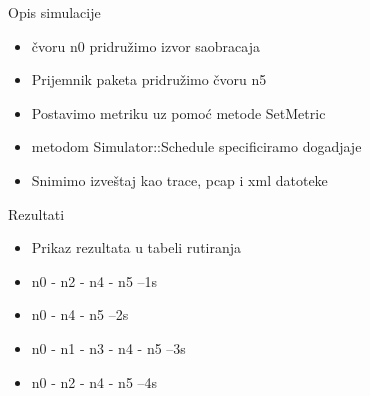 \documentclass{beamer}
\begin{document}
\begin{frame}

\begin{block}{Opis simulacije} 

\begin{itemize}

	\item	\v cvoru n0 pridru\v zimo izvor saobracaja
	\item	Prijemnik paketa pridru\v zimo \v cvoru n5
	\item	Postavimo metriku uz pomo\' c metode SetMetric
	\item	metodom Simulator::Schedule specificiramo dogadjaje
	\item	Snimimo izve\v staj kao trace, pcap i xml datoteke
  \end{itemize}
  \end{block}
\end{frame}

\begin{frame}
\begin{block}{Rezultati} 

\begin{itemize}

	\item	Prikaz rezultata u tabeli rutiranja
	\item	n0 - n2 - n4 - n5   --1s
	\item	n0 - n4 - n5	    --2s
	\item	n0 - n1 - n3 - n4 - n5 --3s
	\item	n0 - n2 - n4 - n5   --4s
  \end{itemize}
  \end{block}
\end{frame}
\end{document}
